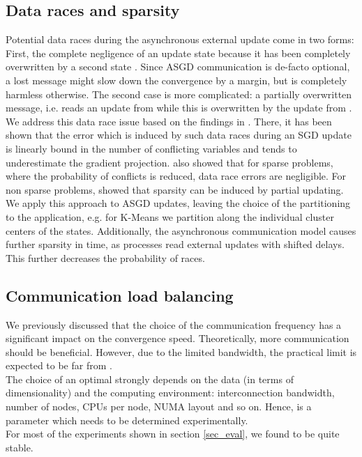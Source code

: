 \documentclass{acm_proc_article-sp}
\begin{document}
\subsection{Data races and sparsity\label{sec_race}}
Potential data races during the asynchronous external update come in two forms: 
First, the complete negligence of an update state  because it has been 
completely overwritten by a second state . Since ASGD communication is 
de-facto optional, a lost message might slow down the convergence by a margin,
but is completely harmless otherwise. The second case is more complicated: a
partially overwritten message, i.e.  reads an update from  while this is overwritten
by the update from .\\   
We address this data race issue based on the findings in \cite{recht2011hogwild}.
There, it has been shown that the error which is induced by such data races 
during an SGD update is linearly bound in the number of conflicting variables 
and tends to underestimate the gradient projection. \cite{recht2011hogwild}
also showed that for sparse problems, where the probability of conflicts is 
reduced, data race errors are negligible. For non sparse problems, 
\cite{recht2011hogwild} showed that sparsity can be induced by 
partial updating. We apply this approach to ASGD updates, leaving the 
choice of the partitioning to the application, e.g. for K-Means
we partition along the individual cluster centers of the states.
Additionally, the asynchronous communication model causes further sparsity
in time, as processes read external updates with shifted delays. This
further decreases the probability of races.               

\subsection{Communication load balancing\label{sec_balance}}
We  previously discussed that the choice of the communication frequency 
 has a significant impact on the convergence speed.
Theoretically, more communication should be beneficial. However, due to
the limited bandwidth, the practical limit is expected to be far from .\\ 
The choice of an optimal  strongly depends on the data (in terms of dimensionality) 
and the computing environment:
interconnection bandwidth, number of nodes, CPUs per node, NUMA layout and 
so on. Hence,  is a parameter which needs to be determined experimentally.\\
For most of the experiments shown in section
\ref{sec_eval}, we found  to be quite stable.
\end{document}
